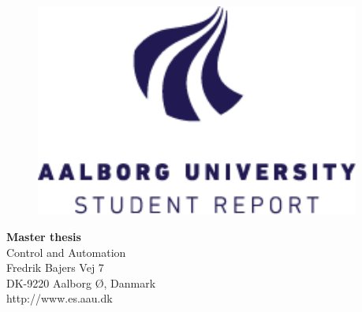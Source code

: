 {}
\thispagestyle{empty}

\begin{minipage}[t]{0.48\textwidth}
\vspace*{-25pt}			%

\begin{figure}[H] 
\includegraphics[trim=0cm 0cm 0cm 0cm,clip,width=0.95\textwidth]{report/introduction/aau_logo1}
\end{figure} 
\end{minipage}
\hfill
\begin{minipage}[t]{0.48\textwidth}
{\small 
\textbf{Master thesis} \\
Control and Automation \\
Fredrik Bajers Vej 7 \\
DK-9220 Aalborg Ø, Danmark\\
http://www.es.aau.dk}
\end{minipage}

\vspace*{1cm}


